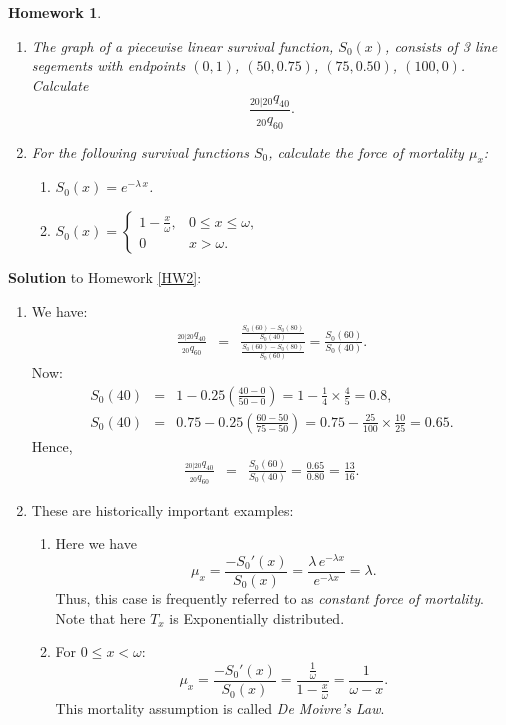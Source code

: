 \documentclass[11pt,fleqn,oneside]{book}
\newtheorem{homework}{Homework}
\begin{document}
\begin{homework}
\label{HW3}
\begin{enumerate}
\item The graph of a piecewise linear survival function, $S_0(x)$, consists of 3 line segements with endpoints $(0,1)$, $(50,0.75)$, $(75,0.50)$, $(100,0)$.
Calculate%
$$
\frac{_{20|20}q_{40}}{_{20}q_{60}}.
$$
\item For the following survival functions $S_0$, calculate the force of mortality $\mu_x$:
\begin{enumerate}
\item $S_0(x) = e^{-\lambda\,x}$.
\item $S_0(x) = \left\{\begin{array}{ll}
1 - \frac{x}{\omega}, & 0\leq x \leq \omega, \\
0 & x > \omega.
\end{array}
\right.$
\end{enumerate}
\end{enumerate}
\end{homework}

\noindent \textbf{Solution} to Homework \ref{HW2}:
\footnotesize  
\begin{enumerate}
\item We have:
\begin{eqnarray*}
\frac{_{20|20}q_{40}}{_{20}q_{60}} &=& \frac{\frac{S_0(60) - S_0(80)}{S_0(40)}}{\frac{S_0(60) - S_0(80)}{S_0(60)}} = \frac{S_0(60)}{S_0(40)}. 
\end{eqnarray*}
Now:
\begin{eqnarray*}
S_0(40) &=& 1 - 0.25 \left(\frac{40 - 0}{50 - 0}\right) = 1- \frac{1}{4} \times \frac{4}{5} = 0.8,\\
S_0(40) &=& 0.75 - 0.25 \left(\frac{60 - 50}{75 - 50}\right) = 0.75- \frac{25}{100} \times \frac{10}{25} = 0.65.
\end{eqnarray*}
Hence,
\begin{eqnarray*}
\frac{_{20|20}q_{40}}{_{20}q_{60}} &=& \frac{S_0(60)}{S_0(40)} = \frac{0.65}{0.80} = \frac{13}{16}.
\end{eqnarray*}
\item These are historically important examples:
\begin{enumerate}
\item Here we have
$$
\mu_x = \frac{-S_0'(x)}{S_0(x)} = \frac{\lambda\,e^{-\lambda x}}{e^{-\lambda x}} = \lambda.
$$
Thus, this case is frequently referred to as \textit{constant force of mortality}. Note that here $T_x$ is Exponentially distributed.
\item For $0\leq x < \omega$:
$$
\mu_x = \frac{-S_0'(x)}{S_0(x)} = \frac{\frac{1}{\omega}}{1 - \frac{x}{\omega}} = \frac{1}{\omega - x}.
$$
This mortality assumption is called \textit{De Moivre's Law}.
\end{enumerate}
\end{enumerate}
\normalsize
\end{document}
